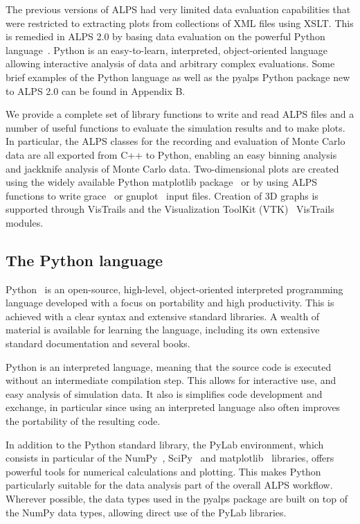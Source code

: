 \documentclass[12pt]{iopart}
\begin{document}
\medskip

The previous versions of ALPS had very limited data evaluation capabilities that were restricted to extracting plots from collections of XML files using XSLT. This is remedied in ALPS 2.0 by basing data evaluation on the powerful Python language~\cite{python}. Python is an easy-to-learn, interpreted, object-oriented language allowing interactive analysis of data and arbitrary complex evaluations.  Some brief examples of the Python language as well as the pyalps Python package new to ALPS 2.0 can be found in Appendix B.

We provide a complete set of library functions to write and read ALPS files and a number of useful functions to evaluate the simulation results and to make plots. In particular, the ALPS classes for the recording and evaluation of Monte Carlo data are all exported from C++ to Python, enabling an easy binning analysis~\cite{Ambegaokar2010} and jackknife analysis of Monte Carlo data.
Two-dimensional plots are created using the widely available Python matplotlib package~\cite{matplotlib} or by using ALPS functions to write grace~\cite{grace} or gnuplot~\cite{gnuplot} input files. Creation of 3D graphs is supported through VisTrails and the Visualization ToolKit (VTK)~\cite{vtk} VisTrails modules.

\subsection{The Python language}

Python~\cite{python} is an open-source, high-level, object-oriented interpreted programming language developed with a focus on portability and high productivity. This is achieved with a clear syntax and extensive standard libraries. A wealth of material is available for learning the language, including its own extensive standard documentation and several books\cite{LearningPython, ProgrammingPython}.

Python is an interpreted language, meaning that the source code is executed without an intermediate compilation step. This allows for interactive use, and easy analysis of simulation data. It also is simplifies code development and exchange, in particular since using an interpreted language also often improves the portability of the resulting code.

In addition to the Python standard library, the PyLab environment, which consists in particular of the NumPy~\cite{numpy}, SciPy~\cite{scipy} and matplotlib~\cite{matplotlib} libraries, offers powerful tools for numerical calculations and plotting. This makes Python particularly suitable for the data analysis part of the overall ALPS workflow. Wherever possible, the data types used in the pyalps package are built on top of the NumPy data types, allowing direct use of the PyLab libraries.
\end{document}
